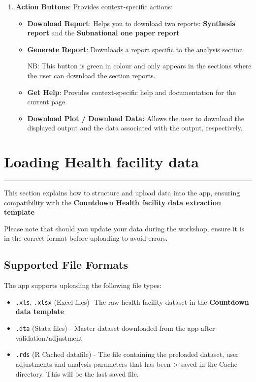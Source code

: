 \documentclass[
  english,
  letterpaper,
  DIV=11,
  numbers=noendperiod]{scrreprt}
\providecommand{\tightlist}{%
  \setlength{\itemsep}{0pt}\setlength{\parskip}{0pt}}
\begin{document}
\begin{enumerate}
\def\labelenumi{\arabic{enumi}.}
\setcounter{enumi}{1}
\tightlist
\item
  \textbf{Action Buttons}: Provides context-specific actions:

  \begin{itemize}
  \item
    \textbf{Download Report}: Helps you to download two reports:
    \textbf{Synthesis report} and the \textbf{Subnational one paper
    report}
  \item
    \textbf{Generate Report}: Downloads a report specific to the
    analysis section.

    NB: This button is green in colour and only appears in the sections
    where the user can download the section reports.
  \item
    \textbf{Get Help}: Provides context-specific help and documentation
    for the current page.
  \item
    \textbf{Download Plot / Download Data:} Allows the user to download
    the displayed output and the data associated with the output,
    respectively.
  \end{itemize}
\end{enumerate}

\chapter{Loading Health facility
data}\label{loading-health-facility-data}

\begin{center}\rule{0.5\linewidth}{0.5pt}\end{center}

This section explains how to structure and upload data into the app,
ensuring compatibility with the \textbf{Countdown Health facility data
extraction template}

Please note that should you update your data during the workshop, ensure
it is in the correct format before uploading to avoid errors.

\section{\texorpdfstring{\textbf{Supported File
Formats}}{Supported File Formats}}\label{supported-file-formats}

The app supports uploading the following file types:

\begin{itemize}
\item
  \texttt{.xls}, \texttt{.xlsx} (Excel files)- The raw health facility
  dataset in the \textbf{Countdown data template}
\item
  \texttt{.dta} (Stata files) - Master dataset downloaded from the app
  after validation/adjustment
\item
  \texttt{.rds} (R Cached datafile) - The file containing the preloaded
  dataset, user adjustments and analysis parameters that has been
  \textgreater{} saved in the Cache directory. This will be the last
  saved file.
\end{itemize}
\end{document}
